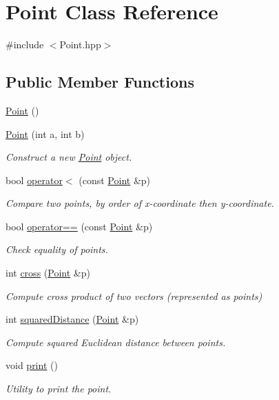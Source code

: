 \hypertarget{classPoint}{}\section{Point Class Reference}
\label{classPoint}


{\ttfamily \#include $<$Point.\+hpp$>$}

\subsection*{Public Member Functions}
\begin{DoxyCompactItemize}
\item 
\mbox{\hyperlink{classPoint_ad92f2337b839a94ce97dcdb439b4325a}{Point}} ()
\item 
\mbox{\hyperlink{classPoint_a810fc4436b6631341363abfedbd6bb97}{Point}} (int a, int b)
\begin{DoxyCompactList}\small\item\em Construct a new \mbox{\hyperlink{classPoint}{Point}} object. \end{DoxyCompactList}\item 
bool \mbox{\hyperlink{classPoint_a9d0a9f62ffc7345f802085706101cd62}{operator$<$}} (const \mbox{\hyperlink{classPoint}{Point}} \&p)
\begin{DoxyCompactList}\small\item\em Compare two points, by order of x-\/coordinate then y-\/coordinate. \end{DoxyCompactList}\item 
bool \mbox{\hyperlink{classPoint_a1a69a0a1dea189f07e044f6eb868937d}{operator==}} (const \mbox{\hyperlink{classPoint}{Point}} \&p)
\begin{DoxyCompactList}\small\item\em Check equality of points. \end{DoxyCompactList}\item 
int \mbox{\hyperlink{classPoint_adcccafffe2054603d2c7bfe949a3675b}{cross}} (\mbox{\hyperlink{classPoint}{Point}} \&p)
\begin{DoxyCompactList}\small\item\em Compute cross product of two vectors (represented as points) \end{DoxyCompactList}\item 
int \mbox{\hyperlink{classPoint_a86a3ee74076f03da9b36bcd2d8894e7d}{squared\+Distance}} (\mbox{\hyperlink{classPoint}{Point}} \&p)
\begin{DoxyCompactList}\small\item\em Compute squared Euclidean distance between points. \end{DoxyCompactList}\item 
void \mbox{\hyperlink{classPoint_a76c5855c06d98aed16b5796a9a50bbee}{print}} ()
\begin{DoxyCompactList}\small\item\em Utility to print the point. \end{DoxyCompactList}\end{DoxyCompactItemize}
